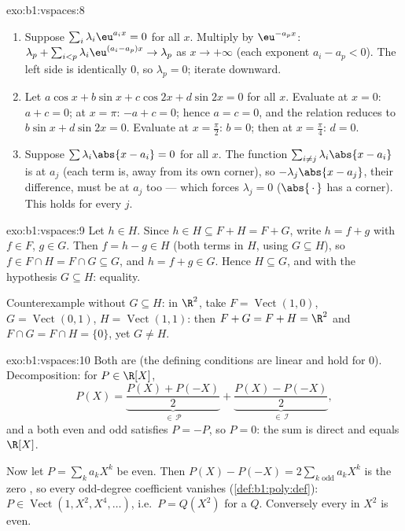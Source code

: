 \begin{solution}{exo:b1:vspaces:8}
\begin{enumerate}
  \item Suppose $\sum_{i} \lambda_i \eu^{a_i x} = 0$ for all $x$.
        Multiply by $\eu^{-a_p x}$: $\lambda_p + \sum_{i < p}
        \lambda_i \eu^{(a_i - a_p)x} \to \lambda_p$ as $x \to
        +\infty$ (each exponent $a_i - a_p < 0$). The left side is
        identically $0$, so $\lambda_p = 0$; iterate downward.
  \item Let $a\cos x + b \sin x + c \cos 2x + d\sin 2x = 0$ for all
        $x$. Evaluate at $x = 0$: $a + c = 0$; at $x = \pi$: $-a + c
        = 0$; hence $a = c = 0$, and the relation reduces to $b\sin
        x + d \sin 2x = 0$. Evaluate at $x = \frac\pi2$: $b = 0$;
        then at $x = \frac\pi4$: $d = 0$.
  \item Suppose $\sum \lambda_i \abs{x - a_i} = 0$ for all $x$. The
        function $\sum_{i \neq j} \lambda_i\abs{x - a_i}$ is
         at $a_j$ (each term is, away from its own
        corner), so $-\lambda_j \abs{x - a_j}$, their difference,
        must be  at $a_j$ too --- which forces
        $\lambda_j = 0$ ($\abs{\,\cdot\,}$ has a corner). This holds
        for every $j$.
\end{enumerate}
\end{solution}

\begin{solution}{exo:b1:vspaces:9}
Let $h \in H$. Since $h \in H \subseteq F + H = F + G$, write $h = f
+ g$ with $f \in F$, $g \in G$. Then $f = h - g \in H$ (both terms
in $H$, using $G \subseteq H$), so $f \in F \cap H = F \cap G
\subseteq G$, and $h = f + g \in G$. Hence $H \subseteq G$, and with
the hypothesis $G \subseteq H$: equality.

Counterexample without $G \subseteq H$: in $\R^2$, take $F =
\operatorname{Vect}(1,0)$, $G = \operatorname{Vect}(0,1)$, $H =
\operatorname{Vect}(1,1)$: then $F + G = F + H = \R^2$ and $F \cap G
= F \cap H = \{0\}$, yet $G \neq H$.
\end{solution}

\begin{solution}{exo:b1:vspaces:10}
Both  are  (the defining conditions are linear and
hold for $0$). Decomposition: for $P \in \R[X]$,
\[
P(X) = \underbrace{\frac{P(X) + P(-X)}{2}}_{\in\,\mathcal P}
+ \underbrace{\frac{P(X) - P(-X)}{2}}_{\in\,\mathcal I},
\]
and a  both even and odd satisfies $P = -P$, so $P = 0$:
the sum is direct and equals $\R[X]$.

Now let $P = \sum_k a_k X^k$ be even. Then $P(X) - P(-X) = 2
\sum_{k \text{ odd}} a_k X^k$ is the zero , so every
odd-degree coefficient vanishes (\cref{def:b1:poly:def}): $P \in
\operatorname{Vect}(1, X^2, X^4, \dots)$, i.e.\ $P = Q(X^2)$ for a
 $Q$. Conversely every  in $X^2$ is even.
\end{solution}

